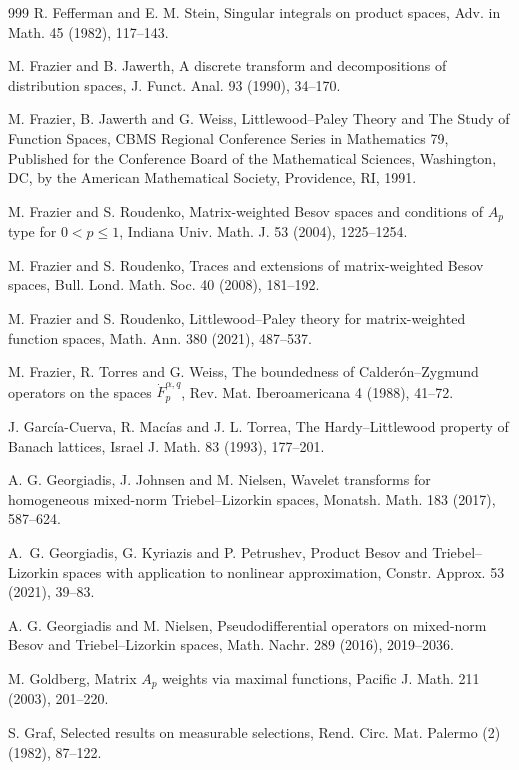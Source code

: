 \documentclass[11pt, reqno]{amsart}
\theoremstyle{definition}
\theoremstyle{remark}
\numberwithin{equation}{section}
\begin{document}
\begin{thebibliography}{999}
R. Fefferman and E. M. Stein,
Singular integrals on product spaces,
Adv. in Math. 45 (1982), 117--143.

M. Frazier and B. Jawerth,
A discrete transform and decompositions of distribution spaces,
J. Funct. Anal. 93 (1990), 34--170.

M. Frazier, B. Jawerth and G. Weiss,
Littlewood--Paley Theory and The Study of Function Spaces,
CBMS Regional Conference Series in Mathematics 79,
Published for the Conference Board of the Mathematical Sciences,
Washington, DC, by the American Mathematical
Society, Providence, RI, 1991.

M. Frazier and S. Roudenko,
Matrix-weighted Besov spaces and conditions
of $A_p$ type for $0<p\leq 1$,
Indiana Univ. Math. J. 53 (2004), 1225--1254.

M. Frazier and S. Roudenko,
Traces and extensions of matrix-weighted Besov spaces,
Bull. Lond. Math. Soc. 40 (2008), 181--192.

M. Frazier and S. Roudenko,
Littlewood--Paley theory for matrix-weighted function spaces,
Math. Ann. 380 (2021), 487--537.

M. Frazier, R. Torres and G. Weiss,
The boundedness of Calder\'on--Zygmund operators on the spaces  $\dot F^{\alpha,q}_p$,
Rev. Mat. Iberoamericana 4 (1988), 41--72.

J. Garc\'ia-Cuerva, R. Mac\'ias and J. L. Torrea,
The Hardy--Littlewood property of Banach lattices,
Israel J. Math. 83 (1993), 177--201.

A. G. Georgiadis, J. Johnsen and M. Nielsen,
Wavelet transforms for homogeneous mixed-norm Triebel--Lizorkin spaces,
Monatsh. Math. 183 (2017), 587--624.

A.~G. Georgiadis, G. Kyriazis and P. Petrushev,
Product Besov and Triebel--Lizorkin spaces with application to nonlinear approximation,
Constr. Approx. 53 (2021), 39--83.

A. G. Georgiadis and M. Nielsen,
Pseudodifferential operators on mixed-norm Besov
and Triebel--Lizorkin spaces,
Math. Nachr. 289 (2016), 2019--2036.

M. Goldberg,
Matrix $A_p$ weights via maximal functions,
Pacific J. Math. 211 (2003), 201--220.

S. Graf,
Selected results on measurable selections,
Rend. Circ. Mat. Palermo (2) (1982), 87--122.


\end{thebibliography}
\end{document}
